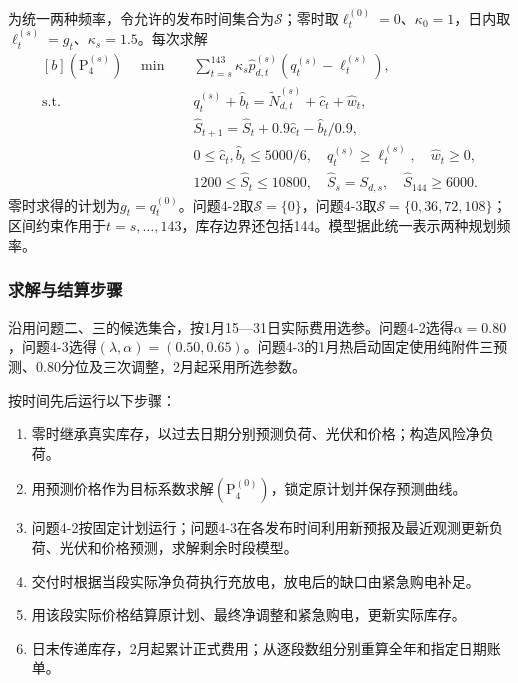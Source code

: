 为统一两种频率，令允许的发布时间集合为$\mathcal S$；零时取$\ell^{(0)}_t=0$、$\kappa_0=1$，日内取$\ell^{(s)}_t=g_t$、$\kappa_s=1.5$。每次求解
\begin{equation}
\begin{aligned}[b]
 (\mathrm P_4^{(s)})\quad\min\quad&
  \sum_{t=s}^{143}\kappa_s\widehat p^{(s)}_{d,t}
       (q^{(s)}_t-\ell^{(s)}_t),\\
 \mathrm{s.t.}\quad&q^{(s)}_t+\widehat b_t
       =\widetilde N^{(s)}_{d,t}+\widehat c_t+\widehat w_t,\\
 &\widehat S_{t+1}=\widehat S_t+0.9\widehat c_t-\widehat b_t/0.9,\\
 &0\le\widehat c_t,\widehat b_t\le5000/6,\quad
   q^{(s)}_t\ge\ell^{(s)}_t,\quad\widehat w_t\ge0,\\
 &1200\le\widehat S_t\le10800,\quad
   \widehat S_s=S_{d,s},\quad\widehat S_{144}\ge6000.
\end{aligned}\label{eq:q4-summary}
\end{equation}
零时求得的计划为$g_t=q^{(0)}_t$。问题4-2取$\mathcal S=\{0\}$，问题4-3取$\mathcal S=\{0,36,72,108\}$；区间约束作用于$t=s,\ldots,143$，库存边界还包括144。模型据此统一表示两种规划频率。

\subsubsection{求解与结算步骤}
沿用问题二、三的候选集合，按1月15—31日实际费用选参。问题4-2选得$\alpha=0.80$，问题4-3选得$(\lambda,\alpha)=(0.50,0.65)$。问题4-3的1月热启动固定使用纯附件三预测、0.80分位及三次调整，2月起采用所选参数。

按时间先后运行以下步骤：
\begin{enumerate}[label=步骤\arabic*,leftmargin=*,align=left]
 \item 零时继承真实库存，以过去日期分别预测负荷、光伏和价格；构造风险净负荷。
 \item 用预测价格作为目标系数求解$(\mathrm P_4^{(0)})$，锁定原计划并保存预测曲线。
 \item 问题4-2按固定计划运行；问题4-3在各发布时间利用新预报及最近观测更新负荷、光伏和价格预测，求解剩余时段模型。
 \item 交付时根据当段实际净负荷执行充放电，放电后的缺口由紧急购电补足。
 \item 用该段实际价格结算原计划、最终净调整和紧急购电，更新实际库存。
 \item 日末传递库存，2月起累计正式费用；从逐段数组分别重算全年和指定日期账单。
\end{enumerate}

